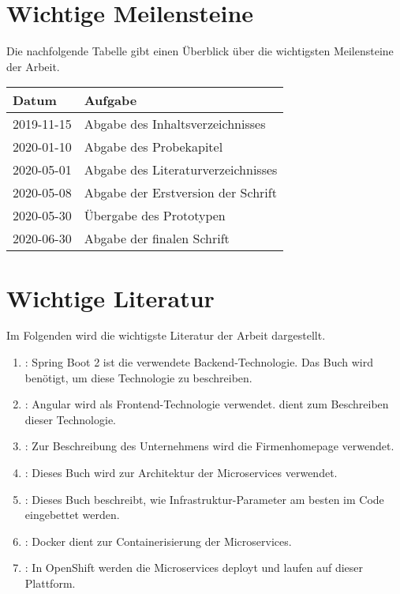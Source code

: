 \documentclass[master,german]{hgbthesis}
\begin{document}
\section{Wichtige Meilensteine}
Die nachfolgende Tabelle gibt einen Überblick über die wichtigsten Meilensteine der Arbeit.
\begin{table}[H]
		\begin{tabular}{ll}
			\hline
			\multicolumn{1}{|l|}{Datum} & \multicolumn{1}{l|}{Aufgabe} \\ \hline
			\multicolumn{1}{|l|}{2019-11-15} & \multicolumn{1}{l|}{Abgabe des Inhaltsverzeichnisses} \\ \hline
			\multicolumn{1}{|l|}{2020-01-10} & \multicolumn{1}{l|}{Abgabe des Probekapitel} \\ \hline
			\multicolumn{1}{|l|}{2020-05-01} & \multicolumn{1}{l|}{Abgabe des Literaturverzeichnisses} \\ \hline
			\multicolumn{1}{|l|}{2020-05-08} & \multicolumn{1}{l|}{Abgabe der Erstversion der Schrift} \\ \hline
			\multicolumn{1}{|l|}{2020-05-30} & \multicolumn{1}{l|}{Übergabe des Prototypen} \\ \hline
			\multicolumn{1}{|l|}{2020-06-30} & \multicolumn{1}{l|}{Abgabe der finalen Schrift} \\ \hline
		\end{tabular}%

\end{table}

\section{Wichtige Literatur}
Im Folgenden wird die wichtigste Literatur der Arbeit dargestellt.
\begin{enumerate}
	\item \cite{SpringBoot2}: Spring Boot 2 ist die verwendete Backend-Technologie. Das Buch  wird benötigt, um diese Technologie zu beschreiben.
	\item \cite{ProAngular6}: Angular wird als Frontend-Technologie verwendet.  dient zum Beschreiben dieser Technologie.
	\item \cite{3BankenIT}: Zur Beschreibung des Unternehmens wird die Firmenhomepage verwendet. 
	\item \cite{Newman2015}: Dieses Buch wird zur Architektur der Microservices verwendet.
	\item \cite{Morris2017}: Dieses Buch beschreibt, wie Infrastruktur-Parameter am besten im Code eingebettet werden.
	\item \cite{DockerDoc}: Docker dient zur Containerisierung der Microservices.
	\item \cite{OpenshiftDoc}: In OpenShift werden die Microservices deployt und laufen auf dieser Plattform.  
\end{enumerate}
\end{document}
